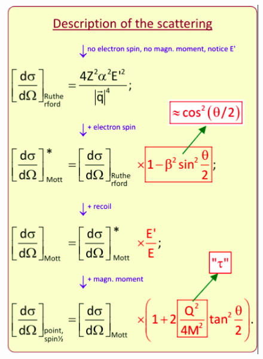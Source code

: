 \begin{minipage}[t]{0.48\textwidth}
    \begin{figure}[H]
        \centering
        \includegraphics[width=\textwidth]{immagini/fig_sez_urto_varie.png}
    \end{figure}
\end{minipage}
